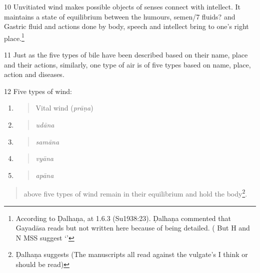 \begin{translation}
\item[10] Unvitiated wind makes possible objects of senses connect with
intellect. It maintains a state of equilibrium between the humours,
semen/7 fluids? and Gastric fluid and actions done by body, speech and
intellect bring to one's right place.\footnote{ According to Ḍalhaṇa,
 at 1.6.3 (Su1938:23). Ḍalhaṇa commented that
Gayadāsa reads  but not written here
because of being detailed. ( But H and N MSS suggest  
`'}

\item[11] Just as the five types of bile have been described based 
on their
name, place and their actions, similarly, one type of air is of five
types based on name, place, action and diseases.

\item[12] Five types of wind:

\begin{enumerate}
\def\labelenumi{\arabic{enumi}.}
\item
\begin{quote}
Vital wind (\emph{prāṇa})
\end{quote}
\item
\begin{quote}
\emph{udāna }
\end{quote}
\item
\begin{quote}
\emph{samāna}
\end{quote}
\item
\begin{quote}
\emph{vyāna}
\end{quote}
\item
\begin{quote}
\emph{apāna}
\end{quote}
\end{enumerate}

\begin{quote}
above five types of wind remain in their equilibrium and hold the
body\footnote{ Ḍalhaṇa suggests 
(The manuscripts all read    against the vulgate's  I think  or  should be read)}.
\end{quote}


\end{translation}
